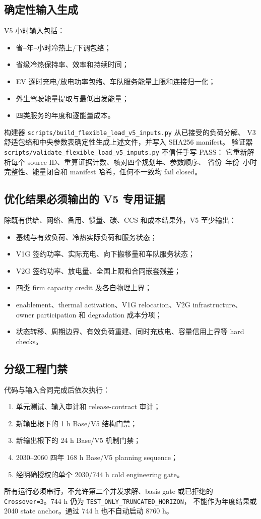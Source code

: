 \documentclass[UTF8,fontset=fandol,12pt]{ctexart}
\newcommand{\code}[1]{\nolinkurl{#1}}
\newcommand{\status}[1]{\nolinkurl{#1}}
\begin{document}
\subsection{确定性输入生成}

V5 小时输入包括：
\begin{itemize}
  \item 省--年--小时冷热上/下调包络；
  \item 省级冷热保持率、效率和持续时间；
  \item EV 逐时充电/放电功率包络、车队服务能量上限和连接归一化；
  \item 外生驾驶能量提取与最低出发能量；
  \item 四类服务的年度和逐能量成本。
\end{itemize}
构建器 \code{scripts/build_flexible_load_v5_inputs.py} 从已接受的负荷分解、
V3 舒适包络和中央参数表确定性生成上述文件，并写入 SHA256 manifest。
验证器 \code{scripts/validate_flexible_load_v5_inputs.py} 不信任手写 PASS：
它重新解析每个 source ID、重算证据计数、核对四个规划年、参数顺序、
省份--年份--小时完整性、能量闭合和 manifest 哈希，任何不一致均 fail closed。

\subsection{优化结果必须输出的 V5 专用证据}

除既有供给、网络、备用、惯量、碳、CCS 和成本结果外，V5 至少输出：
\begin{itemize}
  \item 基线与有效负荷、冷热实际负荷和服务状态；
  \item V1G 签约功率、实际充电、向下搬移量和车队服务状态；
  \item V2G 签约功率、放电量、全国上限和合同嵌套残差；
  \item 四类 firm capacity credit 及各自物理上界；
  \item enablement、thermal activation、V1G relocation、V2G
  infrastructure、owner participation 和 degradation 成本分项；
  \item 状态转移、周期边界、有效负荷重建、同时充放电、容量信用上界等 hard
  checks。
\end{itemize}

\subsection{分级工程门禁}

代码与输入合同完成后依次执行：
\begin{enumerate}
  \item 单元测试、输入审计和 release-contract 审计；
  \item 新输出根下的 1 h Base/V5 结构门禁；
  \item 新输出根下的 24 h Base/V5 机制门禁；
  \item 2030--2060 四年 168 h Base/V5 planning sequence；
  \item 经明确授权的单个 2030/744 h cold engineering gate。
\end{enumerate}
所有运行必须串行，不允许第二个并发求解、basis gate 或已拒绝的
\code{Crossover=3}。744 h 仍为 \status{TEST_ONLY_TRUNCATED_HORIZON}，
不能作为年度结果或 2040 state anchor。通过 744 h 也不自动启动 8760 h。
\end{document}
